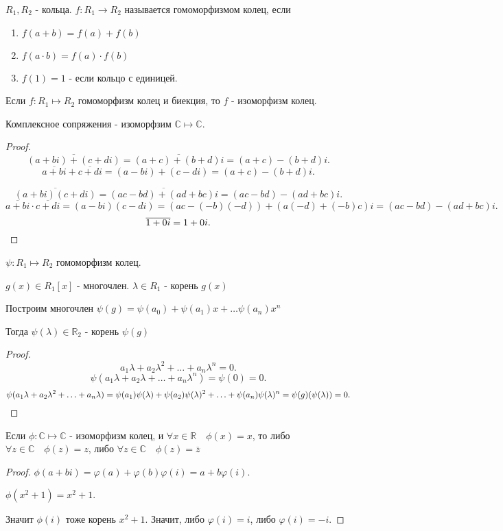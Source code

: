 \begin{definition} 
    $R_1, R_2$ - кольца. $f : R_1 \to R_2$ называется гомоморфизмом колец, если
    \begin{enumerate}
        \item $f(a+b) = f(a)+f(b)$
        \item $f(a\cdot b) = f(a) \cdot f(b)$
        \item $f(1) = 1$ - если кольцо с единицей.
    \end{enumerate}
\end{definition}
\begin{definition} 
    Если $f : R_1 \mapsto R_2$ гомоморфизм колец и биекция, то $f$ - изоморфизм колец.
\end{definition}
\begin{statement} 
    Комплексное сопряжения - изоморфзим $\mathbb{C} \mapsto \mathbb{C}$.
    \begin{proof}
       
        \[ \overline{(a+bi)+(c+di)} = \overline{(a+c)+(b+d)i} = (a+c)-(b+d)i .\]
        \[ \overline{a+bi}+\overline{c+di} = (a-bi)+(c-di) = (a+c)-(b+d)i .\]

        \[ \overline{(a+bi)(c+di)} = \overline{(ac-bd)+(ad+bc)i} = (ac-bd)-(ad+bc)i .\]
        \[ \overline{a+bi}\cdot \overline{c+di} = (a-bi)(c-di) = (ac-(-b)(-d))+(a(-d)+(-b)c)i = (ac-bd)-(ad+bc)i .\]
        \[ \overline{1+0i} = 1+0i .\qedhere\] 
    \end{proof}
\end{statement}
\begin{lemma} 
    $\psi : R_1 \mapsto R_2$ гомоморфизм колец.

    $g(x)\in R_1[x]$ - многочлен. $\lambda\in R_1$ - корень $g(x)$

    Построим многочлен $\psi(g) = \psi(a_0)+\psi(a_1)x + \ldots \psi(a_n)x^{n}$

    Тогда $\psi(\lambda)\in \mathbb{R}_2$ - корень $\psi(g)$
    \begin{proof}
        \[ a_1\lambda + a_2\lambda^2 + \ldots + a_n\lambda^{n} = 0 .\]
        \[ \psi(a_1\lambda+a_2\lambda + \ldots + a_n\lambda^{n}) = \psi(0) = 0 .\]
        \[ \psi(a_1\lambda + a_2\lambda^2 + \ldots + a_n\lambda) = \psi(a_1)\psi(\lambda) + \psi(a_2)\psi(\lambda)^2 + \ldots + \psi(a_n)\psi(\lambda)^{n} = \psi(g)(\psi(\lambda)) = 0 .\qedhere\] 
    \end{proof}
\end{lemma}
\begin{statement}
    Если $\phi : \mathbb{C} \mapsto \mathbb{C}$ - изоморфизм колец, и $\forall{x\in \mathbb{R}}\quad \phi(x) = x$, то либо $\forall{z\in \mathbb{C}}\quad \phi(z) = z$, либо $\forall{z\in \mathbb{C}}\quad \phi(z) = \overline{z}$
        \begin{proof}
            $\phi(a+bi) = \varphi(a)+\varphi(b)\varphi(i) = a+b\varphi(i)$.

            $\phi(x^2+1) = x^2+1$. 

            Значит $\phi(i)$ тоже корень $x^2+1$. Значит, либо $\varphi(i)=i$, либо $\varphi(i)=-i$.
        \end{proof}
\end{statement}
